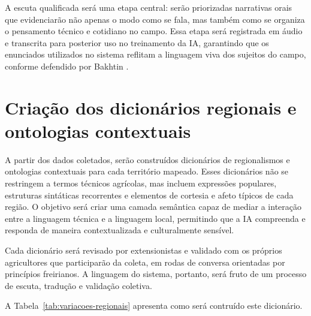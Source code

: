 A escuta qualificada será uma etapa central: serão priorizadas narrativas orais que evidenciarão não apenas o modo como se fala, mas também como se organiza o pensamento técnico e cotidiano no campo. Essa etapa será registrada em áudio e transcrita para posterior uso no treinamento da IA, garantindo que os enunciados utilizados no sistema reflitam a linguagem viva dos sujeitos do campo, conforme defendido por Bakhtin \cite{bakhtin1997estetica}.

\section{Criação dos dicionários regionais e ontologias contextuais}

A partir dos dados coletados, serão construídos dicionários de regionalismos e ontologias contextuais para cada território mapeado. Esses dicionários não se restringem a termos técnicos agrícolas, mas incluem expressões populares, estruturas sintáticas recorrentes e elementos de cortesia e afeto típicos de cada região. O objetivo será criar uma camada semântica capaz de mediar a interação entre a linguagem técnica e a linguagem local, permitindo que a IA compreenda e responda de maneira contextualizada e culturalmente sensível.

Cada dicionário será revisado por extensionistas e validado com os próprios agricultores que participarão da coleta, em rodas de conversa orientadas por princípios freirianos. A linguagem do sistema, portanto, será fruto de um processo de escuta, tradução e validação coletiva.

A Tabela~\ref{tab:variacoes-regionais} apresenta como será contruído este dicionário.

